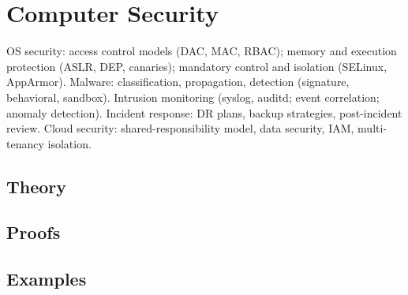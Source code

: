 
\section{Computer Security}
\label{sec:2.3b.11-computer-security}

\begin{ticket}
OS security: access control models (DAC, MAC, RBAC); memory and execution protection (ASLR, DEP, canaries); mandatory control and isolation (SELinux, AppArmor). Malware: classification, propagation, detection (signature, behavioral, sandbox). Intrusion monitoring (syslog, auditd; event correlation; anomaly detection). Incident response: DR plans, backup strategies, post-incident review. Cloud security: shared-responsibility model, data security, IAM, multi-tenancy isolation.
\end{ticket}

\subsection*{Theory}

\subsection*{Proofs}

\subsection*{Examples}
